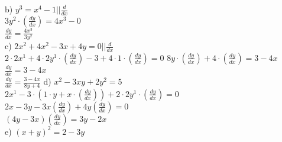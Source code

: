\documentclass{article}
\begin{document}
  b) $y^3=x^4-1 || \frac{d}{dx}$\\
  $3y^2\cdot(\frac{dy}{dx})=4x^3-0$\\
  $\frac{dy}{dx}=\frac{4x^3}{3y^2}$\\
  c) $2x^2+4x^2-3x+4y=0 || \frac{d}{dx}$\\
  $2\cdot 2x^1+4\cdot 2y^1\cdot (\frac{dy}{dx})-3+4\cdot1\cdot(\displaystyle\frac{dy}{dx})=0$
  $8y\cdot(\frac{dy}{dx})+4\cdot(\frac{dy}{dx})=3-4x$\\
  $\frac{dy}{dx}=3-4x$\\
  $\frac{dy}{dx}=\frac{3-4x}{8y+4}$
  d) $x^2-3xy+2y^2=5$\\
  $2x^1-3\cdot(1\cdot y+x\cdot(\frac{dy}{dx}))+2\cdot2y^1\cdot(\frac{dy}{dx})=0$\\
  $2x-3y-3x(\frac{dy}{dx})+4y(\frac{dy}{dx})=0$\\
  $(4y-3x)(\frac{dy}{dx})=3y-2x$\\
  e) $(x+y)^2=2-3y$\\
  
  

   
\end{document}
